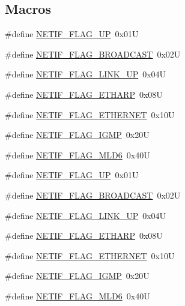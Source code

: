 \subsection*{Macros}
\begin{DoxyCompactItemize}
\item 
\#define \hyperlink{group__netif__flags_gab47d7d130693dc155f480a5bf447725e}{N\+E\+T\+I\+F\+\_\+\+F\+L\+A\+G\+\_\+\+UP}~0x01U
\item 
\#define \hyperlink{group__netif__flags_gaef64fe15c82bc7b235366923e517104e}{N\+E\+T\+I\+F\+\_\+\+F\+L\+A\+G\+\_\+\+B\+R\+O\+A\+D\+C\+A\+ST}~0x02U
\item 
\#define \hyperlink{group__netif__flags_ga75f5a2b9276c93e3bd18a568459fd2d8}{N\+E\+T\+I\+F\+\_\+\+F\+L\+A\+G\+\_\+\+L\+I\+N\+K\+\_\+\+UP}~0x04U
\item 
\#define \hyperlink{group__netif__flags_ga92448dc510bc8d700c09e5c971ef0676}{N\+E\+T\+I\+F\+\_\+\+F\+L\+A\+G\+\_\+\+E\+T\+H\+A\+RP}~0x08U
\item 
\#define \hyperlink{group__netif__flags_ga76ad9d0cf9f029df0ab2a998c64040dc}{N\+E\+T\+I\+F\+\_\+\+F\+L\+A\+G\+\_\+\+E\+T\+H\+E\+R\+N\+ET}~0x10U
\item 
\#define \hyperlink{group__netif__flags_gac9493b923d733c73f6006d9714826558}{N\+E\+T\+I\+F\+\_\+\+F\+L\+A\+G\+\_\+\+I\+G\+MP}~0x20U
\item 
\#define \hyperlink{group__netif__flags_gab14fbe1447d2fdbdf5abc87f51eb6508}{N\+E\+T\+I\+F\+\_\+\+F\+L\+A\+G\+\_\+\+M\+L\+D6}~0x40U
\item 
\#define \hyperlink{group__netif__flags_gab47d7d130693dc155f480a5bf447725e}{N\+E\+T\+I\+F\+\_\+\+F\+L\+A\+G\+\_\+\+UP}~0x01U
\item 
\#define \hyperlink{group__netif__flags_gaef64fe15c82bc7b235366923e517104e}{N\+E\+T\+I\+F\+\_\+\+F\+L\+A\+G\+\_\+\+B\+R\+O\+A\+D\+C\+A\+ST}~0x02U
\item 
\#define \hyperlink{group__netif__flags_ga75f5a2b9276c93e3bd18a568459fd2d8}{N\+E\+T\+I\+F\+\_\+\+F\+L\+A\+G\+\_\+\+L\+I\+N\+K\+\_\+\+UP}~0x04U
\item 
\#define \hyperlink{group__netif__flags_ga92448dc510bc8d700c09e5c971ef0676}{N\+E\+T\+I\+F\+\_\+\+F\+L\+A\+G\+\_\+\+E\+T\+H\+A\+RP}~0x08U
\item 
\#define \hyperlink{group__netif__flags_ga76ad9d0cf9f029df0ab2a998c64040dc}{N\+E\+T\+I\+F\+\_\+\+F\+L\+A\+G\+\_\+\+E\+T\+H\+E\+R\+N\+ET}~0x10U
\item 
\#define \hyperlink{group__netif__flags_gac9493b923d733c73f6006d9714826558}{N\+E\+T\+I\+F\+\_\+\+F\+L\+A\+G\+\_\+\+I\+G\+MP}~0x20U
\item 
\#define \hyperlink{group__netif__flags_gab14fbe1447d2fdbdf5abc87f51eb6508}{N\+E\+T\+I\+F\+\_\+\+F\+L\+A\+G\+\_\+\+M\+L\+D6}~0x40U
\end{DoxyCompactItemize}



